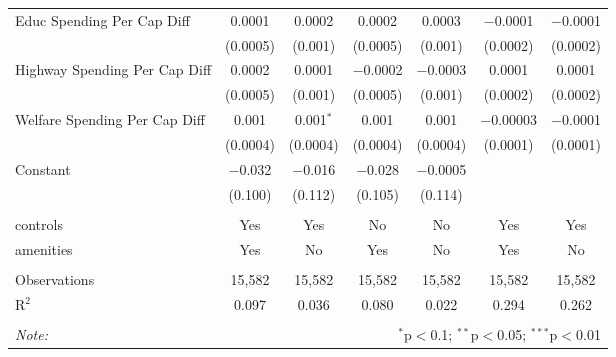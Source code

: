 \begin{table}[!htbp]
\begin{tabular}{@{\extracolsep{5pt}}lcccccc}
  Educ Spending Per Cap Diff & 0.0001 & 0.0002 & 0.0002 & 0.0003 & $-$0.0001 & $-$0.0001 \\ 
  & (0.0005) & (0.001) & (0.0005) & (0.001) & (0.0002) & (0.0002) \\ 
  Highway Spending Per Cap Diff & 0.0002 & 0.0001 & $-$0.0002 & $-$0.0003 & 0.0001 & 0.0001 \\ 
  & (0.0005) & (0.001) & (0.0005) & (0.001) & (0.0002) & (0.0002) \\ 
  Welfare Spending Per Cap Diff & 0.001 & 0.001$^{*}$ & 0.001 & 0.001 & $-$0.00003 & $-$0.0001 \\ 
  & (0.0004) & (0.0004) & (0.0004) & (0.0004) & (0.0001) & (0.0001) \\ 
  Constant & $-$0.032 & $-$0.016 & $-$0.028 & $-$0.0005 &  &  \\ 
  & (0.100) & (0.112) & (0.105) & (0.114) &  &  \\ 
 \hline \\[-1.8ex] 
controls & Yes & Yes & No & No & Yes & Yes \\ 
amenities & Yes & No & Yes & No & Yes & No \\ 
\hline \\[-1.8ex] 
Observations & 15,582 & 15,582 & 15,582 & 15,582 & 15,582 & 15,582 \\ 
R$^{2}$ & 0.097 & 0.036 & 0.080 & 0.022 & 0.294 & 0.262 \\ 
\hline 
\hline \\[-1.8ex] 
\textit{Note:}  & \multicolumn{6}{r}{$^{*}$p$<$0.1; $^{**}$p$<$0.05; $^{***}$p$<$0.01} \\ 
\end{tabular} 
\end{table} 
